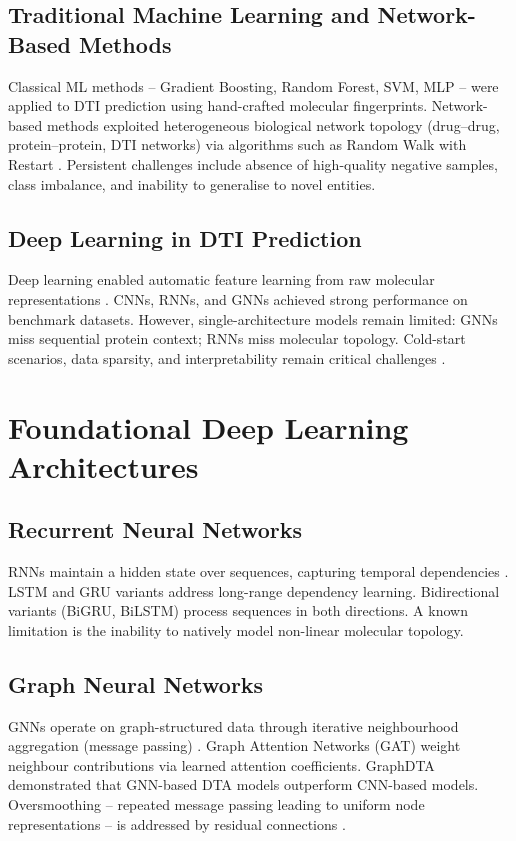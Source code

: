 \documentclass[12pt,a4paper,oneside]{report}
\begin{document}
\subsection{Traditional Machine Learning and Network-Based Methods}
Classical ML methods -- Gradient Boosting, Random Forest, SVM, MLP -- were applied to DTI prediction using hand-crafted molecular fingerprints. Network-based methods exploited heterogeneous biological network topology (drug--drug, protein--protein, DTI networks) via algorithms such as Random Walk with Restart \citep{cao2024ngcn, wu2018network}. Persistent challenges include absence of high-quality negative samples, class imbalance, and inability to generalise to novel entities.

\subsection{Deep Learning in DTI Prediction}
Deep learning enabled automatic feature learning from raw molecular representations \citep{vefghi2025, liao2025ai}. CNNs, RNNs, and GNNs achieved strong performance on benchmark datasets. However, single-architecture models remain limited: GNNs miss sequential protein context; RNNs miss molecular topology. Cold-start scenarios, data sparsity, and interpretability remain critical challenges \citep{panahandeh2025, hua2025mmdg}.

\section{Foundational Deep Learning Architectures}

\subsection{Recurrent Neural Networks}
RNNs maintain a hidden state over sequences, capturing temporal dependencies \citep{abbasi2020, mienye2024}. LSTM and GRU variants address long-range dependency learning. Bidirectional variants (BiGRU, BiLSTM) process sequences in both directions. A known limitation is the inability to natively model non-linear molecular topology.

\subsection{Graph Neural Networks}
GNNs operate on graph-structured data through iterative neighbourhood aggregation (message passing) \citep{zhang2021gnn}. Graph Attention Networks (GAT) weight neighbour contributions via learned attention coefficients. GraphDTA \citep{nguyen2021graphdta} demonstrated that GNN-based DTA models outperform CNN-based models. Oversmoothing -- repeated message passing leading to uniform node representations -- is addressed by residual connections \citep{deng2025}.
\end{document}
